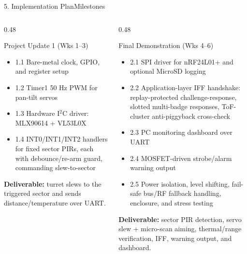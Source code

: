 \documentclass[aspectratio=169, 10pt]{beamer}
\begin{document}
\begin{frame}{5. Implementation Plan}{Milestones}
    \begin{columns}[T]
        \begin{column}{0.48\textwidth}
            \begin{block}{Project Update 1 (Wks 1--3)}
                \footnotesize
                \begin{itemize}
                    \item 1.1 Bare-metal clock, GPIO, and register setup
                    \item 1.2 Timer1 50 Hz PWM for pan-tilt servos
                    \item 1.3 Hardware I$^2$C driver: MLX90614 + VL53L0X
                    \item 1.4 INT0/INT1/INT2 handlers for fixed sector PIRs, each with debounce/re-arm guard, commanding slew-to-sector
                \end{itemize}
                \textbf{Deliverable:} turret slews to the triggered sector and sends distance/temperature over UART.
            \end{block}
        \end{column}
        \begin{column}{0.48\textwidth}
            \begin{block}{Final Demonstration (Wks 4--6)}
                \footnotesize
                \begin{itemize}
                    \item 2.1 SPI driver for nRF24L01+ and optional MicroSD logging
                    \item 2.2 Application-layer IFF handshake: replay-protected challenge-response, slotted multi-badge responses, ToF-cluster anti-piggyback cross-check
                    \item 2.3 PC monitoring dashboard over UART
                    \item 2.4 MOSFET-driven strobe/alarm warning output
                    \item 2.5 Power isolation, level shifting, fail-safe bus/RF fallback handling, enclosure, and stress testing
                \end{itemize}
                \textbf{Deliverable:} sector PIR detection, servo slew + micro-scan aiming, thermal/range verification, IFF, warning output, and dashboard.
            \end{block}
        \end{column}
    \end{columns}
\end{frame}
\end{document}
